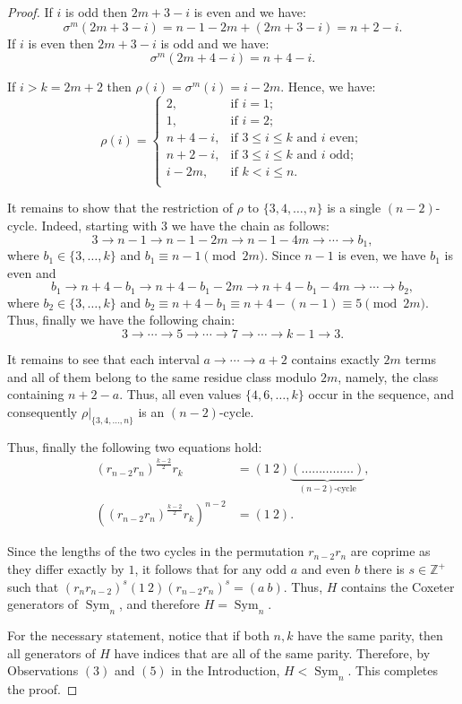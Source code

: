 \documentclass[10pt,a4paper]{amsart}
\theoremstyle{plain}
\theoremstyle{definition}
\DeclareMathOperator{\Sym}{\mathrm{Sym}}
\begin{document}
\begin{proof}
If $i$ is odd then $2m+3-i$ is even and we have: 
\[
\sigma^{m}(2m+3-i) = n-1 - 2m + (2m+3-i) = n + 2 - i.
\]
If $i$ is even then $2m+3-i$ is odd and we have: 
\[
\sigma^{m}(2m+4-i) = n + 4 - i.     
\]

If $i > k = 2m+2$ then $\rho(i) = \sigma^{m}(i) = i - 2m$. Hence, we have:
\[
\rho(i)=
\begin{cases}
	2, & \text{if }i=1;\\
	1, & \text{if }i=2;\\
	n+4 - i, & \text{if }3\leqslant i\leqslant k \mbox{ and } i \text{ even};\\
	n+2 - i, & \text{if }3\leqslant i\leqslant k \mbox{ and } i \text{ odd};\\
	i - 2m, & \text{if }k < i\leqslant n.\\
\end{cases}
\]

It remains to show that the restriction of $\rho$ to $\{3,4,\dots,n\}$ is a single $(n-2)$-cycle. Indeed, starting with $3$ we have the chain as follows:
\[
3 \rightarrow n-1 \rightarrow n-1-2m \rightarrow n-1-4m \rightarrow \cdots \rightarrow b_1, 
\]
where $b_1 \in \{3, \dots, k\}$ and $b_1 \equiv n-1 \pmod{2m}$. Since $n-1$ is even, we have $b_1$ is even and  
\[
b_1 \rightarrow n+4-b_1 \rightarrow n+4-b_1-2m \rightarrow n+4-b_1-4m \rightarrow \cdots \rightarrow b_2, 
\] 
where $b_2 \in \{3, \dots, k\}$ and $b_2 \equiv n + 4-b_1 \equiv  n + 4 -(n-1) \equiv 5 \pmod{2m}$. Thus, finally we have the following chain:
\[
3 \rightarrow \cdots \rightarrow 5 \rightarrow \cdots \rightarrow 7 \rightarrow \cdots \rightarrow k-1 \rightarrow 3.
\]

It remains to see that each interval $a \rightarrow \cdots \rightarrow a+2$ contains exactly $2m$ terms and all of them belong to the same residue class modulo $2m$, namely, the class containing $n+2-a$. Thus, all even values $\{4,6,\dots,k\}$ occur in the sequence, and consequently $\rho|_{\{3,4,\dots,n\}}$ is an $(n-2)$-cycle.

Thus, finally the following two equations hold: 
\begin{align*}
(r_{n-2}r_{n})^{\frac{k-2}{2}}r_k &= (1\ 2) \underbrace{(\dots \ldots \ldots \ldots \ldots)}_{(n-2)\text{-cycle}}, \\
((r_{n-2}r_{n})^{\frac{k-2}{2}}r_k)^{n-2} &=(1\ 2).
\end{align*}

Since the lengths of the two cycles in the permutation $r_{n-2}r_n$ are coprime as they differ exactly by $1$, it follows that for any odd $a$ and even $b$ there is $s \in \mathbb{Z}^+$ such that $(r_{n}r_{n-2})^{s} (1\ 2)(r_{n-2}r_{n})^{s} = (a\ b)$. Thus, $H$ contains the Coxeter generators of $\Sym_n$, and therefore $H = \Sym_n$.

For the necessary statement, notice that if both $n,k$ have the same parity, then all generators of $H$ have indices that are all of the same parity. Therefore, by Observations $(3)$ and $(5)$ in the Introduction, $H<\Sym_n$. This completes the proof. 
\end{proof}
\end{document}
